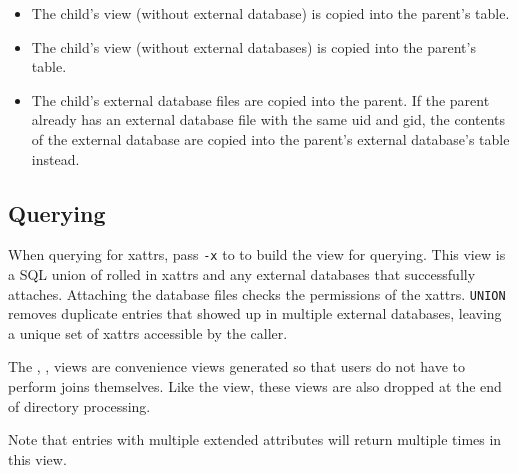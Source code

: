\begin{itemize}
\item The child's \xattrsavail view (without external database) is
  copied into the parent's \xattrsrollup table.
\item The child's \xattrfiles view (without external databases) is
  copied into the parent's \xattrfilesrollup table.
\item The child's external database files are copied into the
  parent. If the parent already has an external database file with the
  same uid and gid, the contents of the external database are copied
  into the parent's external database's \xattrsrollup table instead.
\end{itemize}

\subsection{Querying}
When querying for xattrs, pass \texttt{-x} to \gufiquery to build the
\xattrs view for querying. This view is a SQL union of rolled in
xattrs and any external databases that successfully
attaches. Attaching the database files checks the permissions of the
xattrs. \texttt{UNION} removes duplicate entries that showed up in
multiple external databases, leaving a unique set of xattrs accessible
by the caller.

The \xentries, \xpentries, \xsummary views are convenience views
generated so that users do not have to perform joins themselves. Like
the \xattrs view, these views are also dropped at the end of directory
processing.

Note that entries with multiple extended attributes will return
multiple times in this view.
